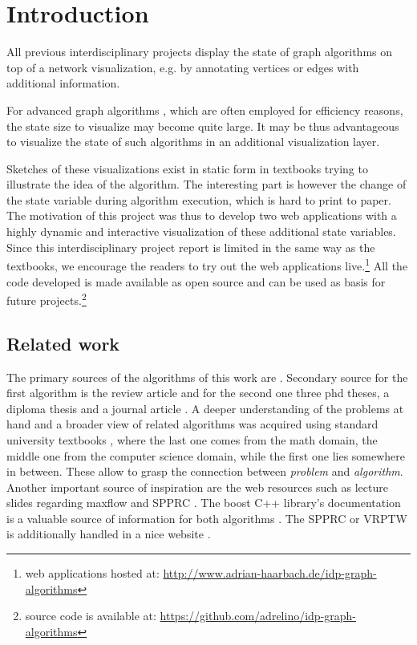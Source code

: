 \chapter{Introduction}\label{ch:1}

All previous interdisciplinary projects \cite{storz2013idp,velden2014idp,sefidgar2015idp,becker2015idp,zoennchen2015idp,fischer2016idp,feil2016idp} display the state of graph algorithms on top of a network visualization, e.g. by annotating vertices or edges with additional information.

For advanced graph algorithms \cite{goldberg1988new,irnich2005shortest}, which are often employed for efficiency reasons, the state size to visualize may become quite large. It may be thus advantageous to visualize the state of such algorithms in an additional visualization layer. 

Sketches of these visualizations exist in static form in textbooks \cite{ahuja1993network,cormen2009introduction,jungnickel2013graphs} trying to illustrate the idea of the algorithm. The interesting part is however the change of the state variable during algorithm execution, which is hard to print to paper. The motivation of this project was thus to develop two web applications with a highly dynamic and interactive visualization of these additional state variables. Since this interdisciplinary project report is limited in the same way as the textbooks, we encourage the readers to try out the web applications live.\footnote{web applications hosted at: \url{http://www.adrian-haarbach.de/idp-graph-algorithms}} All the code developed is made available as open source and can be used as basis for future projects.\footnote{source code is available at: \url{https://github.com/adrelino/idp-graph-algorithms}}

\section{Related work}
The primary sources of the algorithms of this work are \cite{goldberg1988new,irnich2005shortest}. Secondary source for the first algorithm is the review article \cite{goldberg2014efficient} and for the second one three phd theses, a diploma thesis and a journal article \cite{solomon1983vehicle,ziegelmann2001constrained,schlechte2003resource,feillet2004exact,garcia2009resource}.
A deeper understanding of the problems at hand and a broader view of related algorithms was acquired using standard university textbooks \cite{ahuja1993network,cormen2009introduction,jungnickel2013graphs}, where the last one comes from the math domain, the middle one from the computer science domain, while the first one lies somewhere in between. These allow to grasp the connection between \textit{problem} and \textit{algorithm}.
Another important source of inspiration are the web resources such as lecture slides regarding maxflow \cite{mayer2013prakt,mehlhorn2000maximum,williamson2007network,matuschke2016network} and SPPRC \cite{petersen2006label}. The boost C++ library's documentation is a valuable source of information for both algorithms \cite{boost2002push,boost2006rc}. The SPPRC or VRPTW is additionally handled in a nice website \cite{networking2013vehicle}.

